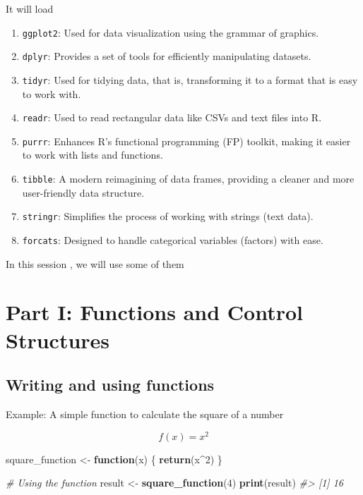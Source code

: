 \documentclass[
]{book}
\newenvironment{Shaded}{\begin{snugshade}}{\end{snugshade}}
\newcommand{\CommentTok}[1]{\textcolor[rgb]{0.56,0.35,0.01}{\textit{#1}}}
\newcommand{\ControlFlowTok}[1]{\textcolor[rgb]{0.13,0.29,0.53}{\textbf{#1}}}
\newcommand{\DecValTok}[1]{\textcolor[rgb]{0.00,0.00,0.81}{#1}}
\newcommand{\FunctionTok}[1]{\textcolor[rgb]{0.13,0.29,0.53}{\textbf{#1}}}
\newcommand{\NormalTok}[1]{#1}
\newcommand{\OtherTok}[1]{\textcolor[rgb]{0.56,0.35,0.01}{#1}}
\newcommand{\SpecialCharTok}[1]{\textcolor[rgb]{0.81,0.36,0.00}{\textbf{#1}}}
\providecommand{\tightlist}{%
  \setlength{\itemsep}{0pt}\setlength{\parskip}{0pt}}
\begin{document}
It will load

\begin{enumerate}
\def\labelenumi{\arabic{enumi}.}
\tightlist
\item
  \texttt{ggplot2}: Used for data visualization using the grammar of graphics.
\item
  \texttt{dplyr}: Provides a set of tools for efficiently manipulating datasets.
\item
  \texttt{tidyr}: Used for tidying data, that is, transforming it to a format that is easy to work with.
\item
  \texttt{readr}: Used to read rectangular data like CSVs and text files into R.
\item
  \texttt{purrr}: Enhances R's functional programming (FP) toolkit, making it easier to work with lists and functions.
\item
  \texttt{tibble}: A modern reimagining of data frames, providing a cleaner and more user-friendly data structure.
\item
  \texttt{stringr}: Simplifies the process of working with strings (text data).
\item
  \texttt{forcats}: Designed to handle categorical variables (factors) with ease.
\end{enumerate}

In this session , we will use some of them

\chapter*{Part I: Functions and Control Structures}\label{part-i-functions-and-control-structures}

\section*{Writing and using functions}\label{writing-and-using-functions}

Example: A simple function to calculate the square of a number

\[
f(x) = x^2
\]

\begin{Shaded}
\begin{Highlighting}[]

\NormalTok{square\_function }\OtherTok{\textless{}{-}} \ControlFlowTok{function}\NormalTok{(x) \{}
  \FunctionTok{return}\NormalTok{(x}\SpecialCharTok{\^{}}\DecValTok{2}\NormalTok{)}
\NormalTok{\}}

\CommentTok{\# Using the function}
\NormalTok{result }\OtherTok{\textless{}{-}} \FunctionTok{square\_function}\NormalTok{(}\DecValTok{4}\NormalTok{)}
\FunctionTok{print}\NormalTok{(result)}
\CommentTok{\#\textgreater{} [1] 16}
\end{Highlighting}
\end{Shaded}
\end{document}

